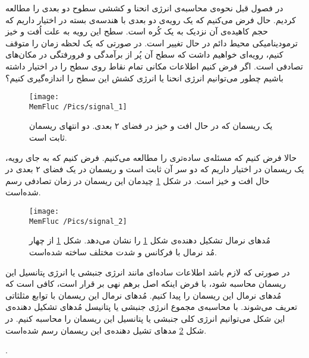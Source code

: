 


در فصول قبل نحوه‌ی محاسبه‌ی انرژی انحنا و کششی سطوح دو بعدی را مطالعه کردیم. حال فرض می‌کنیم که یک رویه‌ی دو بعدی با هندسه‌ی بسته در اختیار داریم که حجم کاهیده‌ی آن نزدیک به یک کُره است. سطح این رویه به علت اُفت و خیز ترمودینامیکی محیط دائم در حال تغییر است. در صورتی که یک لحظه زمان را متوقف کنیم، رویه‌ای خواهیم داشت که سطح آن پُر از برآمدگی و فرورفتگی در مکان‌های تصادفی است. اگر فرض کنیم اطلاعات مکانی تمام نقاط روی سطح را در اختیار داشته باشیم چطور می‌توانیم انرژی انحنا یا انرژی کشش این سطح را اندازه‌گیری کنیم؟ 

\begin{figure}[h]
\begin{center}
\texttt{[image: \\MemFluc /Pics/signal\_1]}
\caption{
 یک ریسمان که در حال افت و خیز در فضای ۲ بعدی. دو انتهای ریسمان ثابت است.
}
\label{fig:flucString1}
\end{center}
\end{figure}


حالا فرض کنیم که مسئله‌ی ساده‌تری را مطالعه می‌کنیم. فرض کنیم که به جای رویه، یک ریسمان در اختیار داریم که دو سر آن ثابت است و ریسمان  در یک فضای ۲ بعدی  در حال افت و خیز است. در شکل 
\ref{fig:flucString1}
چیدمان این ریسمان در زمان تصادفی‌ رسم شده‌است.
\begin{figure}[h]
\begin{center}
\texttt{[image: \\MemFluc /Pics/signal\_2]}
\caption{
مُدهای نرمال تشکیل دهنده‌ی شکل
\ref{fig:flucString1}
را نشان می‌دهد. شکل
\ref{fig:flucString1}
از چهار مُد نرمال با فرکانس و شد‌ت مختلف ساخته شده‌است. 
}
\label{fig:flucString2}
\end{center}
\end{figure}
در صورتی که لازم باشد اطلاعات ساده‌ای مانند انرژی جنبشی یا انرژی پتانسیل این ریسمان محاسبه شود، با فرض اینکه اصل برهم نهی بر قرار است، کافی است که مُدهای نرمال این ریسمان را پیدا کنیم. مُدهای نرمال این ریسمان با توابع مثلثاتی تعریف می‌شوند. با محاسبه‌ی مجموع انرژی جنبشی یا پتانیسل مُدهای تشکیل دهنده‌ی این شکل می‌توانیم انرژی کلی جنبشی یا پتانسیل این ریسمان را محاسبه کنیم. در شکل
\ref{fig:flucString2}
مد‌های تشیل دهنده‌ی این ریسمان رسم شده‌است.


.
 
 
 
 
 
 
 
 
 
 
 